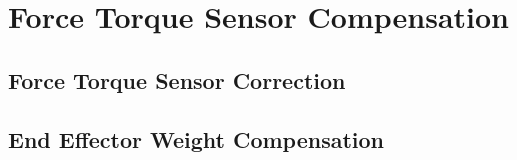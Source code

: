 \chapter{Force Torque Sensor Compensation}
\label{chapter:correction}

\section{Force Torque Sensor Correction}

\section{End Effector Weight Compensation}

